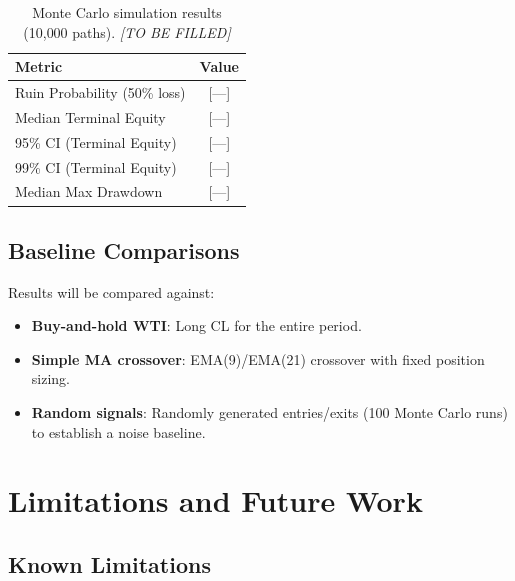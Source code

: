\documentclass[12pt,a4paper]{article}
\begin{document}
\begin{table}[h!]
\centering
\caption{Monte Carlo simulation results (10{,}000 paths). \textit{[TO BE FILLED]}}
\label{tab:monte_carlo}
\begin{tabular}{@{}lc@{}}
\toprule
\textbf{Metric} & \textbf{Value} \\
\midrule
Ruin Probability (50\% loss) & [---] \\
Median Terminal Equity & [---] \\
95\% CI (Terminal Equity) & [---] \\
99\% CI (Terminal Equity) & [---] \\
Median Max Drawdown & [---] \\
\bottomrule
\end{tabular}
\end{table}

\subsection{Baseline Comparisons}

Results will be compared against:
\begin{itemize}[leftmargin=*]
    \item \textbf{Buy-and-hold WTI}: Long CL for the entire period.
    \item \textbf{Simple MA crossover}: EMA(9)/EMA(21) crossover with fixed position sizing.
    \item \textbf{Random signals}: Randomly generated entries/exits (100 Monte Carlo runs) to establish a noise baseline.
\end{itemize}

\section{Limitations and Future Work}
\label{sec:limitations}

\subsection{Known Limitations}
\end{document}
